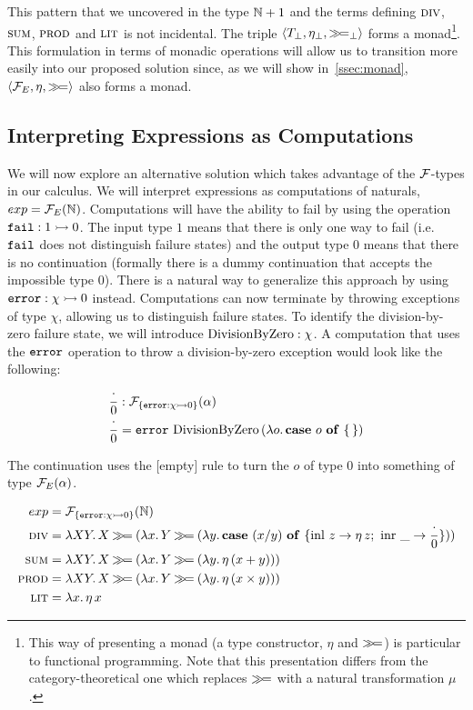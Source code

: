 This pattern that we uncovered in the type $\mathbb{N} + 1$ and the terms defining
$\textsc{div}$, $\textsc{sum}$, $\textsc{prod}$ and $\textsc{lit}$ is not incidental. The triple
$\left<T_\bot, \eta_\bot, \mathbin{\gg\!=}_\bot \right>$ forms a monad\footnote{This
  way of presenting a monad (a type constructor, $\eta$ and $\mathbin{\gg\!=}$) is
  particular to functional programming. Note that this presentation differs
  from the category-theoretical one which replaces $\mathbin{\gg\!=}$ with a natural
  transformation $\mu$ \cite{mac1978categories}.}. This formulation in
terms of monadic operations will allow us to transition more easily into
our proposed solution since, as we will show in~\ref{ssec:monad},
$\left< \mathcal{F}_E, \eta, \mathbin{\gg\!=} \right>$ also forms a monad.

\subsection{Interpreting Expressions as Computations}
\label{ssec:expressions-as-computations}

We will now explore an alternative solution which takes advantage of the
$\mathcal{F}$-types in our calculus. We will interpret expressions as computations
of naturals, $exp = \mathcal{F}_E(\mathbb{N})$. Computations will have the ability to fail
by using the operation $\mathtt{fail} : 1 \rightarrowtail 0$. The input type $1$ means
that there is only one way to fail (i.e.\ $\mathtt{fail}$ does not distinguish
failure states) and the output type $0$ means that there is no continuation
(formally there is a dummy continuation that accepts the impossible type
$0$). There is a natural way to generalize this approach by using
$\mathtt{error} : \chi \rightarrowtail 0$ instead. Computations can now terminate by
throwing exceptions of type $\chi$, allowing us to distinguish failure
states. To identify the division-by-zero failure state, we will introduce
$\operatorname{DivisionByZero} : \chi$. A computation that uses the $\mathtt{error}$ operation to
throw a division-by-zero exception would look like the following:

\begin{align*}
  \frac{\cdot}{0} &: \mathcal{F}_{\{\mathtt{error} : \chi \rightarrowtail 0\}}(\alpha) \\
  \frac{\cdot}{0} &= \mathtt{error}\,\operatorname{DivisionByZero}\,(\lambda o.\, \text{\textbf{case} $o$ \textbf{of} \{\,\}})
\end{align*}

The continuation uses the [empty] rule to turn the $o$ of type $0$ into
something of type $\mathcal{F}_E(\alpha)$.

\begin{align*}
  exp &= \mathcal{F}_{\{\mathtt{error} : \chi \rightarrowtail 0\}}(\mathbb{N}) \\
  \textsc{div} &= \lambda X Y.\, X \mathbin{\gg\!=} (\lambda x.\, Y \mathbin{\gg\!=} (\lambda y.\, \text{\textbf{case} $(x / y)$ \textbf{of} $\{ \operatorname{inl}\,z \to \eta\,z;\ \operatorname{inr}\,\_ \to \frac{\cdot}{0} \}$})) \\
  \textsc{sum} &= \lambda X Y.\, X \mathbin{\gg\!=} (\lambda x.\, Y \mathbin{\gg\!=} (\lambda y.\, \eta\,(x + y))) \\
  \textsc{prod} &= \lambda X Y.\, X \mathbin{\gg\!=} (\lambda x.\, Y \mathbin{\gg\!=} (\lambda y.\, \eta\,(x \times y))) \\
  \textsc{lit} &= \lambda x.\, \eta\,x
\end{align*}

